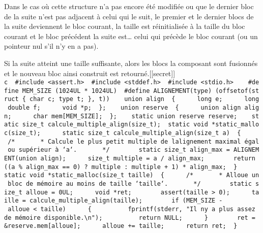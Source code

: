 \documentclass[]{article}
\begin{document}
Dans le cas où cette structure n'a pas encore été modifiée ou que le
dernier bloc de la suite n'est pas adjacent à celui qui le suit, le
premier et le dernier blocs de la suite deviennent le bloc courant, la
taille est réinitialisée à la taille du bloc courant et le bloc
précédent la suite est\ldots{} celui qui précède le bloc courant (ou un
pointeur nul s'il n'y en a pas).

Si la suite atteint une taille suffisante, alors les blocs la composant
sont fusionnés et le nouveau bloc ainsi construit est
retourné.{[}{[}secret{]}{]}
\textbar{}\texttt{c\ \textbar{}\ \#include\ \textless{}assert.h\textgreater{}\ \textbar{}\ \#include\ \textless{}stddef.h\textgreater{}\ \textbar{}\ \#include\ \textless{}stdio.h\textgreater{}\ \textbar{}\ \ \textbar{}\ \#define\ MEM\_SIZE\ (1024UL\ *\ 1024UL)\ \textbar{}\ \#define\ ALIGNEMENT(type)\ (offsetof(struct\ \{\ char\ c;\ type\ t;\ \},\ t))\ \textbar{}\ \ \textbar{}\ union\ align\ \textbar{}\ \{\ \textbar{}\ \ \ \ \ long\ e;\ \textbar{}\ \ \ \ \ long\ double\ f;\ \textbar{}\ \ \ \ \ void\ *p;\ \textbar{}\ \};\ \textbar{}\ \ \textbar{}\ union\ reserve\ \textbar{}\ \{\ \textbar{}\ \ \ \ \ union\ align\ align;\ \textbar{}\ \ \ \ \ char\ mem{[}MEM\_SIZE{]};\ \textbar{}\ \};\ \textbar{}\ \ \textbar{}\ static\ union\ reserve\ reserve;\ \textbar{}\ \ \textbar{}\ static\ size\_t\ calcule\_multiple\_align(size\_t);\ \textbar{}\ static\ void\ *static\_malloc(size\_t);\ \textbar{}\ \ \textbar{}\ \ \textbar{}\ static\ size\_t\ calcule\_multiple\_align(size\_t\ a)\ \textbar{}\ \{\ \textbar{}\ \ \ \ \ /*\ \textbar{}\ \ \ \ \ \ *\ Calcule\ le\ plus\ petit\ multiple\ de\ l\textquotesingle{}alignement\ maximal\ égal\ ou\ supérieur\ à\ `a`.\ \textbar{}\ \ \ \ \ \ */\ \textbar{}\ \ \textbar{}\ \ \ \ \ static\ size\_t\ align\_max\ =\ ALIGNEMENT(union\ align);\ \textbar{}\ \ \ \ \ size\_t\ multiple\ =\ a\ /\ align\_max;\ \textbar{}\ \ \textbar{}\ \ \ \ \ return\ ((a\ \%\ align\_max\ ==\ 0)\ ?\ multiple\ :\ multiple\ +\ 1)\ *\ align\_max;\ \textbar{}\ \}\ \textbar{}\ \ \textbar{}\ \ \textbar{}\ static\ void\ *static\_malloc(size\_t\ taille)\ \textbar{}\ \{\ \textbar{}\ \ \ \ \ /*\ \textbar{}\ \ \ \ \ \ *\ Alloue\ un\ bloc\ de\ mémoire\ au\ moins\ de\ taille\ `taille`.\ \textbar{}\ \ \ \ \ \ */\ \textbar{}\ \ \textbar{}\ \ \ \ \ static\ size\_t\ alloue\ =\ 0UL;\ \textbar{}\ \ \ \ \ void\ *ret;\ \textbar{}\ \ \textbar{}\ \ \ \ \ assert(taille\ \textgreater{}\ 0);\ \textbar{}\ \ \ \ \ taille\ =\ calcule\_multiple\_align(taille);\ \textbar{}\ \ \textbar{}\ \ \ \ \ if\ (MEM\_SIZE\ -\ alloue\ \textless{}\ taille)\ \textbar{}\ \ \ \ \ \{\ \textbar{}\ \ \ \ \ \ \ \ \ fprintf(stderr,\ "Il\ n\textquotesingle{}y\ a\ plus\ assez\ de\ mémoire\ disponible.\textbackslash{}n");\ \textbar{}\ \ \ \ \ \ \ \ \ return\ NULL;\ \textbar{}\ \ \ \ \ \}\ \textbar{}\ \ \textbar{}\ \ \ \ \ ret\ =\ \&reserve.mem{[}alloue{]};\ \textbar{}\ \ \ \ \ alloue\ +=\ taille;\ \textbar{}\ \ \ \ \ return\ ret;\ \textbar{}\ \}\ \textbar{}}
\end{document}
